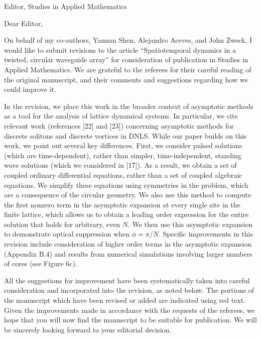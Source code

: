 \documentclass[11pt]{letter}
\begin{document}
\address{Ross Parker \\
Department of Mathematics \\
Southern Methodist University \\
Dallas, TX 75275 \\
\texttt{rhparker@smu.edu}}%
\signature{Ross Parker}
\begin{letter}{Editor, Studies in Applied Mathematics}

\opening{Dear Editor,}

On behalf of my co-authors, Yannan Shen, Alejandro Aceves, and John Zweck, I would like to submit revisions to the article ``Spatiotemporal dynamics in a twisted, circular waveguide array'' for consideration of publication in Studies in Applied Mathematics. We are grateful to the referees for their careful reading of the original manuscript, and their comments and suggestions regarding how we could improve it. 

In the revision, we place this work in the broader context of asymptotic methods as a tool for the analysis of lattice dynamical systems. In particular, we cite relevant work (references [22] and [23]) concerning asymptotic methods for discrete solitons and discrete vortices in DNLS. While our paper builds on this work, we point out several key differences. First, we consider pulsed solutions (which are time-dependent), rather than simpler, time-independent, standing wave solutions (which we considered in [17]). As a result, we obtain a set of coupled ordinary differential equations, rather than a set of coupled algebraic equations. We simplify these equations using symmetries in the problem, which are a consequence of the circular geometry. We also use this method to compute the first nonzero term in the asymptotic expansion at every single site in the finite lattice, which allows us to obtain a leading order expression for the entire solution that holds for arbitrary, even $N$. We then use this asymptotic expansion to demonstrate optical suppression when $\phi=\pi/N$. Specific improvements in this revision include consideration of higher order terms in the asymptotic expansion (Appendix B.4) and results from numerical simulations involving larger numbers of cores (see Figure 6c).

All the suggestions for improvement have been systematically taken into careful consideration and incorporated into the revision, as noted below. The portions of the manuscript which have been revised or added are indicated using red text. Given the improvements made in accordance with the requests of the referees, we hope that you will now find the manuscript to be suitable for publication. We will be sincerely looking forward to your editorial decision.


\end{letter}
\end{document}
